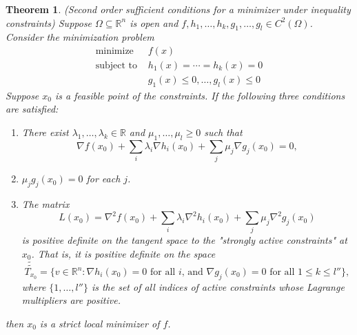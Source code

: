 \documentclass[11pt]{book}
\newcommand{\R}{\mathbb{R}}
\newtheorem{theorem}{Theorem}[subsection]
\begin{document}
\begin{theorem}
(Second order sufficient conditions for a minimizer under inequality constraints) Suppose $\Omega \subseteq \R^n$ is open and $f, h_1, \dots, h_k, g_1, \dots, g_l \in C^2(\Omega)$. Consider the minimization problem
\begin{align*}
\text{minimize } &f(x) \\
\text{subject to } &h_1(x) = \cdots = h_k(x) = 0 \\
&g_1(x) \leq 0, \dots, g_l(x) \leq 0
\end{align*}
Suppose $x_0$ is a feasible point of the constraints. If the following three conditions are satisfied:
\begin{enumerate}
\item
There exist $\lambda_1, \dots, \lambda_k \in \R$ and $\mu_1, \dots, \mu_l \geq 0$ such that
\[
\nabla f(x_0) + \sum_i \lambda_i \nabla h_i(x_0) + \sum_j \mu_j \nabla g_j(x_0) = 0,
\]

\item
$\mu_j g_j(x_0) = 0$ for each $j$.

\item
The matrix
\[
L(x_0) = \nabla^2 f(x_0) + \sum_i \lambda_i \nabla^2 h_i(x_0) + \sum_j \mu_j \nabla^2 g_j(x_0)
\]
is positive definite on the tangent space to the "strongly active constraints" at $x_0$. That is, it is positive definite on the space
\[
\tilde{\tilde{T_{x_0}}} = \{ v \in \R^n : \nabla h_i(x_0) = 0 \text{ for all $i$, and } \nabla g_j(x_0) = 0 \text{ for all $1 \leq k \leq l''$} \},
\]
where $\{1, \dots, l''\}$ is the set of all indices of active constraints whose Lagrange multipliers are positive.
\end{enumerate}
then $x_0$ is a strict local minimizer of $f$.
\end{theorem}
\end{document}
